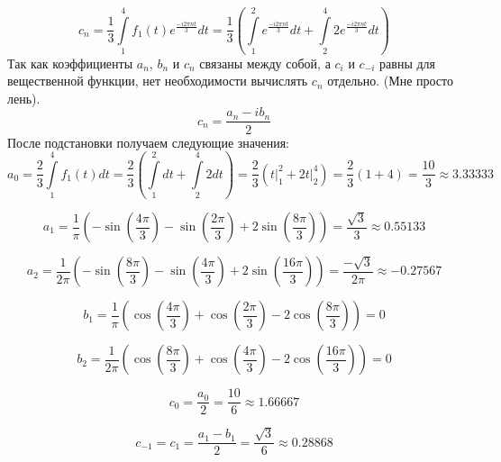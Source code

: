 \begin{equation}
    c_n = \frac{1}{3}\int\limits_{1}^{4} f_1(t)e^{\frac{-i 2\pi n t}{3}} dt = \frac{1}{3}\left(\int\limits_{1}^{2}e^{\frac{-i 2\pi n t}{3}}dt + \int\limits_{2}^{4}2e^{\frac{-i 2\pi n t}{3}}dt \right) 
\end{equation}
Так как коэффициенты $a_n$, $b_n$ и $c_n$ связаны между собой, а $c_i$ и $c_{-i}$ равны для вещественной функции, нет необходимости вычислять $c_n$ отдельно. (Мне просто лень). 
\begin{equation}
    c_n = \frac{a_n - ib_n}{2}
\end{equation}
После подстановки получаем следующие значения:
\begin{equation}
    a_0 = \frac{2}{3} \int\limits_{1}^{4} f_1(t) dt = \frac{2}{3} \left( \int\limits_{1}^{2} dt + \int\limits_{2}^{4} 2 dt \right) = \frac{2}{3} \left(t\Big|_{1}^{2} + 2t\Big|_{2}^{4}\right) = \frac{2}{3} (1 + 4) = \frac{10}{3} \approx 3.33333
\end{equation}

\begin{equation}
    a_1 = \frac{1}{\pi}\left(-\sin\left( \frac{4\pi}{3}\right) - \sin\left(\frac{2\pi}{3} \right) + 2\sin\left(\frac{8\pi}{3}\right)\right) = \frac{\sqrt3}{3} \approx 0.55133 
\end{equation}

\begin{equation}
    a_2 = \frac{1}{2\pi}\left(-\sin\left( \frac{8\pi}{3}\right) - \sin\left(\frac{4\pi}{3} \right) + 2\sin\left(\frac{16\pi}{3}\right)\right) = \frac{-\sqrt{3}}{2\pi} \approx -0.27567
\end{equation}

\begin{equation}
    b_1 = \frac{1}{\pi}\left(\cos\left( \frac{4\pi}{3}\right) + \cos\left(\frac{2\pi}{3} \right) - 2\cos\left(\frac{8\pi}{3}\right)\right) = 0
\end{equation}

\begin{equation}
    b_2 = \frac{1}{2\pi}\left(\cos\left( \frac{8\pi}{3}\right) + \cos\left(\frac{4\pi}{3} \right) - 2\cos\left(\frac{16\pi}{3}\right)\right) = 0
\end{equation}

\begin{equation}
    c_0 = \frac{a_0}{2} = \frac{10}{6} \approx 1.66667
\end{equation}

\begin{equation}
    c_{-1} = c_1 = \frac{a_1 - b_1}{2} = \frac{\sqrt3}{6} \approx 0.28868
\end{equation}

